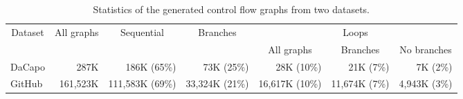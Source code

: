 \begin{table*}[t]
\scriptsize
\centering
\caption{Statistics of the generated control flow graphs from two datasets.}
\begin{tabular}{lrrrrrr}
\toprule
\multicolumn{1}{c}{Dataset} & \multicolumn{1}{c}{All graphs} & \multicolumn{1}{c}{Sequential} & \multicolumn{1}{c}{Branches} & \multicolumn{3}{c}{Loops} \\
\cmidrule(lr){5-7}      &       &       &       & \multicolumn{1}{c}{All graphs} & \multicolumn{1}{c}{Branches} & \multicolumn{1}{c}{No branches} \\
\midrule
DaCapo & 287K & 186K (65\%) & 73K (25\%) & 28K (10\%) & 21K (7\%) & 7K (2\%)\\
GitHub & 161,523K & 111,583K (69\%) & 33,324K (21\%) & 16,617K (10\%) & 11,674K (7\%) & 4,943K (3\%) \\
\bottomrule
\end{tabular}%
\label{tab:dataset-table}%
\end{table*}%
